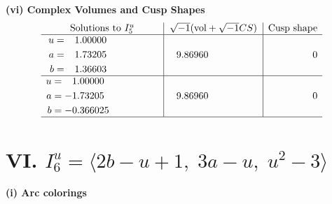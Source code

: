 \documentclass[1p]{elsarticle_modified}
\theoremstyle{definition}
\newcommand{\I}{\sqrt{-1}}
\begin{document}
\newpage\flushleft \textbf{(vi) Complex Volumes and Cusp Shapes}
$$\begin{array}{c|c|c}  
\text{Solutions to }I^u_{5}& \I (\text{vol} + \sqrt{-1}CS) & \text{Cusp shape}\\
 \hline 
\begin{aligned}
u &= \phantom{-}1.00000\phantom{ +0.000000I} \\
a &= \phantom{-}1.73205\phantom{ +0.000000I} \\
b &= \phantom{-}1.36603\phantom{ +0.000000I}\end{aligned}
 & \phantom{-}9.86960\phantom{ +0.000000I} & \phantom{-0.000000 } 0 \\ \hline\begin{aligned}
u &= \phantom{-}1.00000\phantom{ +0.000000I} \\
a &= -1.73205\phantom{ +0.000000I} \\
b &= -0.366025\phantom{ +0.000000I}\end{aligned}
 & \phantom{-}9.86960\phantom{ +0.000000I} & \phantom{-0.000000 } 0\\
 \hline 
 \end{array}$$\newpage\newpage\renewcommand{\arraystretch}{1}
\centering \section*{VI. $I^u_{6}= \langle 2 b- u+1,\;3 a- u,\;u^2-3 \rangle$}
\flushleft \textbf{(i) Arc colorings}\\
\end{document}
